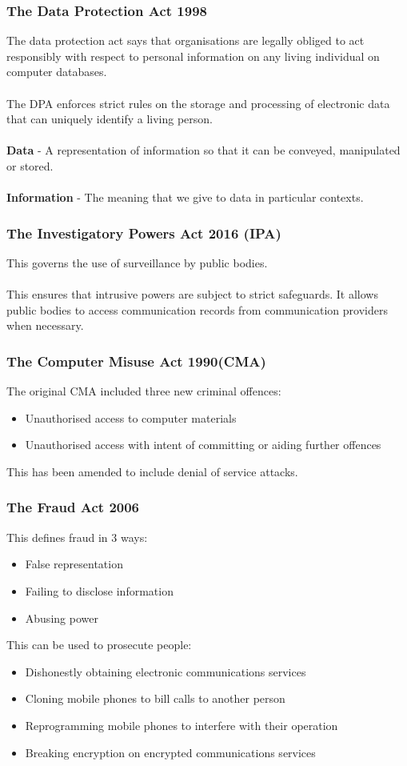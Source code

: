 \documentclass{article}[18pt]
\begin{document}
\subsubsection{The Data Protection Act 1998}
The data protection act says that organisations are legally obliged to act responsibly with respect to personal information on any living individual on computer databases.\\
\\
The DPA enforces strict rules on the storage and processing of electronic data that can uniquely identify a living person.\\
\\
\textbf{Data} - A representation of information so that it can be conveyed, manipulated or stored.\\
\\
\textbf{Information} - The meaning that we give to data in particular contexts.
\subsubsection{The Investigatory Powers Act 2016 (IPA)}
This governs the use of surveillance by public bodies.\\
\\
This ensures that intrusive powers are subject to strict safeguards. It allows public bodies to access communication records from communication providers when necessary.\\
\subsubsection{The Computer Misuse Act 1990(CMA)}
The original CMA included three new criminal offences:
\begin{itemize}
\item Unauthorised access to computer materials
\item Unauthorised access with intent of committing or aiding further offences
\end{itemize}
This has been amended to include denial of service attacks.
\subsubsection{The Fraud Act 2006}
This defines fraud in 3 ways:
\begin{itemize}
\item False representation
\item Failing to disclose information
\item Abusing power
\end{itemize}
This can be used to prosecute people:
\begin{itemize}
\item Dishonestly obtaining electronic communications services
\item Cloning mobile phones to bill calls to another person
\item Reprogramming mobile phones to interfere with their operation
\item Breaking encryption on encrypted communications services
\end{itemize}
\end{document}
